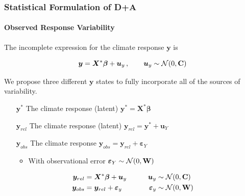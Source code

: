 \documentclass{beamer}
\newcommand{\C}{\ensuremath{\text{Cov}}}
\def\*#1{\bm{#1}}
\def\C{\textbf{\text{C}}}
\def\W{\textbf{\text{W}}}
\begin{document}

\begin{frame}
\frametitle{Statistical Formulation of D+A}
\framesubtitle{Observed Response Variability}

The \alert{incomplete} expression for the climate response $\*y$ is
\begin{alertblock}{}
\vspace*{-5pt}\setlength\belowdisplayshortskip{0pt}
\begin{equation*}
\*y = \*X^* \*\beta + \* u_y  \, , \qquad \*u_y \sim \mathcal{N} (0,\C) 
\end{equation*}	
\end{alertblock}

We propose three different $\*y$ states to fully incorporate all of the sources of variability.

\begin{itemize}
\item[$\*y^*$] The  climate response (latent) \hfill $\*y^* = \*X^* \*\beta \qquad \qquad \qquad$
\item[$\*y_{rel}$] The  climate response (latent) \hfill $\*y_{rel} = \*y^* + \*u_Y \,\; \qquad \qquad$
\item[$\*y_{obs}$] The  climate response \hfill $\*y_{obs} = \*y_{rel} + \*\varepsilon_Y \, \qquad \qquad$
\begin{itemize}
\item With observational error $\* \varepsilon_Y \sim \mathcal N(0,\W)$
\end{itemize}
\end{itemize}

\begin{exampleblock}{}
\vspace*{-\baselineskip}\setlength\belowdisplayshortskip{0pt}
\begin{alignat*}{3}
\*y_{rel} &= \*X^* \*\beta + \*u_y \nonumber  \qquad  &\*u_y &\sim \mathcal N(0,\C) \\
\*y_{obs} &= \*y_{rel} + \*\varepsilon_y &\*\varepsilon_y &\sim \mathcal N(0,\W)
\end{alignat*}
\end{exampleblock}

\end{frame}
\end{document}
